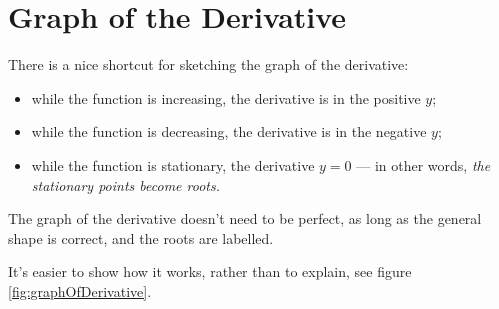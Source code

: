 \section{Graph of the Derivative}
There is a nice shortcut for sketching the graph of the derivative:

\begin{itemize}
	\item while the function is increasing, the derivative is in the positive $y$;
	\item while the function is decreasing, the derivative is in the negative $y$;
	\item while the function is stationary, the derivative $y=0$ --- in other words, \textit{the stationary points become roots.}
\end{itemize}

The graph of the derivative doesn't need to be perfect, as long as the general shape is correct, and the roots are labelled.

It's easier to show how it works, rather than to explain, see figure \ref{fig:graphOfDerivative}.

